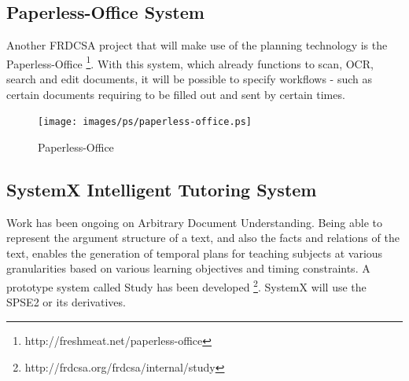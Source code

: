 \documentclass[letterpaper]{article}
\begin{document}
\subsection{Paperless-Office System}

Another FRDCSA project that will make use of the planning technology
is the
Paperless-Office \footnote{http://freshmeat.net/paperless-office}.
With this system, which already functions to scan, OCR, search and
edit documents, it will be possible to specify workflows - such as
certain documents requiring to be filled out and sent by certain
times.

\begin{figure}[h!]
  \centering
      \texttt{[image: images/ps/paperless-office.ps]}
  \caption{Paperless-Office}
\end{figure}


\subsection{SystemX Intelligent Tutoring System}

Work has been ongoing on Arbitrary Document Understanding.  Being able
to represent the argument structure of a text, and also the facts and
relations of the text, enables the generation of temporal plans for
teaching subjects at various granularities based on various learning
objectives and timing constraints.  A prototype system called Study
has been developed \footnote{http://frdcsa.org/frdcsa/internal/study}.
SystemX will use the SPSE2 or its derivatives.


\end{document}
